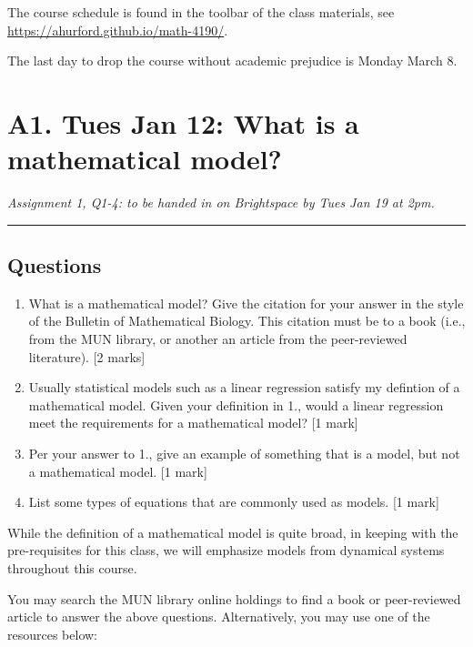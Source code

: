 \documentclass[]{book}
\begin{document}
The course schedule is found in the toolbar of the class materials, see
\url{https://ahurford.github.io/math-4190/}.

The last day to drop the course without academic prejudice is Monday
March 8.

\chapter{A1. Tues Jan 12: What is a mathematical
model?}\label{a1.-tues-jan-12-what-is-a-mathematical-model}

\emph{Assignment 1, Q1-4: to be handed in on Brightspace by Tues Jan 19
at 2pm.}

\begin{center}\rule{0.5\linewidth}{0.5pt}\end{center}

\section*{Questions}\label{questions}

\begin{enumerate}
\def\labelenumi{\arabic{enumi}.}
\item
  What is a mathematical model? Give the citation for your answer in the
  style of the Bulletin of Mathematical Biology. This citation must be
  to a book (i.e., from the MUN library, or another an article from the
  peer-reviewed literature). {[}2 marks{]}
\item
  Usually statistical models such as a linear regression satisfy my
  defintion of a mathematical model. Given your definition in 1., would
  a linear regression meet the requirements for a mathematical model?
  {[}1 mark{]}
\item
  Per your answer to 1., give an example of something that is a model,
  but not a mathematical model. {[}1 mark{]}
\item
  List some types of equations that are commonly used as models. {[}1
  mark{]}
\end{enumerate}

While the definition of a mathematical model is quite broad, in keeping
with the pre-requisites for this class, we will emphasize models from
dynamical systems throughout this course.

You may search the MUN library online holdings to find a book or
peer-reviewed article to answer the above questions. Alternatively, you
may use one of the resources below:
\end{document}
